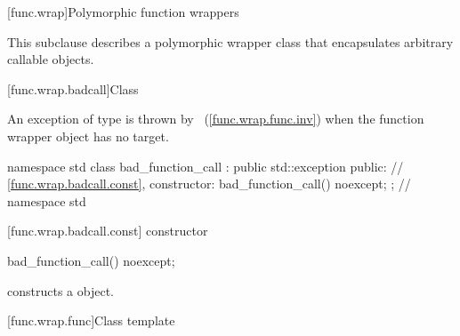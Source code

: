 [func.wrap]{Polymorphic function wrappers}%

\pnum
This subclause describes a polymorphic wrapper class that
encapsulates arbitrary callable objects.

[func.wrap.badcall]{Class }%
%

\pnum
An exception of type  is thrown by
~(\ref{func.wrap.func.inv})
when the function wrapper object has no target.

\begin{codeblock}
namespace std {
  class bad_function_call : public std::exception {
  public:
    // \ref{func.wrap.badcall.const}, constructor:
    bad_function_call() noexcept;
  };
} // namespace std
\end{codeblock}

[func.wrap.badcall.const]{ constructor}

%
\begin{itemdecl}
bad_function_call() noexcept;
\end{itemdecl}

\begin{itemdescr}
\pnum\effects constructs a  object.
\end{itemdescr}

[func.wrap.func]{Class template }


